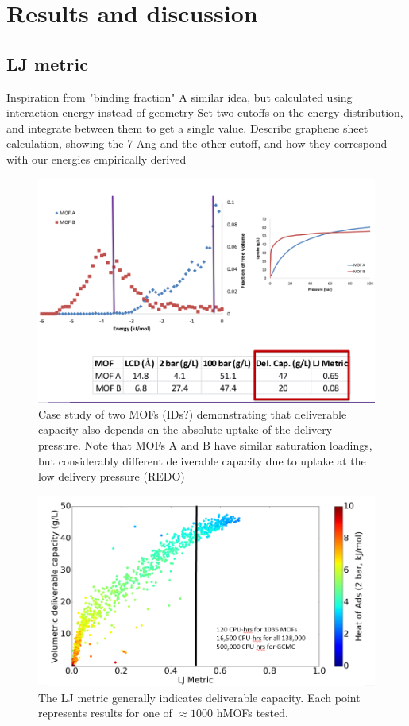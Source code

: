 \documentclass[letterpaper]{article}
\begin{document}
\section{Results and discussion}

\subsection{LJ metric}

\begin{outline}
	\1 Inspiration from "binding fraction"
		\2 A similar idea, but calculated using interaction energy instead of geometry
		\2 Set two cutoffs on the energy distribution, and integrate between them to get a single value.
	\1 Describe graphene sheet calculation, showing the 7 Ang and the other cutoff, and how they correspond with our energies empirically derived
\end{outline}

\begin{figure}[H]
	\centering
	\includegraphics[width=0.75\columnwidth]{Figs/binding_case_study.png}
	\caption{Case study of two MOFs (IDs?) demonstrating that deliverable capacity also depends on the absolute uptake of the delivery pressure.  Note that MOFs A and B have similar saturation loadings, but considerably different deliverable capacity due to uptake at the low delivery pressure (REDO)}
	\label{fig:binding_cases}
\end{figure}

\begin{figure}[H]
	\centering
	\includegraphics[width=0.75\columnwidth]{Figs/lj_metric.png}
	\caption{The LJ metric generally indicates deliverable capacity.  Each point represents results for one of $\approx 1000$ hMOFs tested.}
	\label{fig:lj_metric}
\end{figure}
\end{document}
